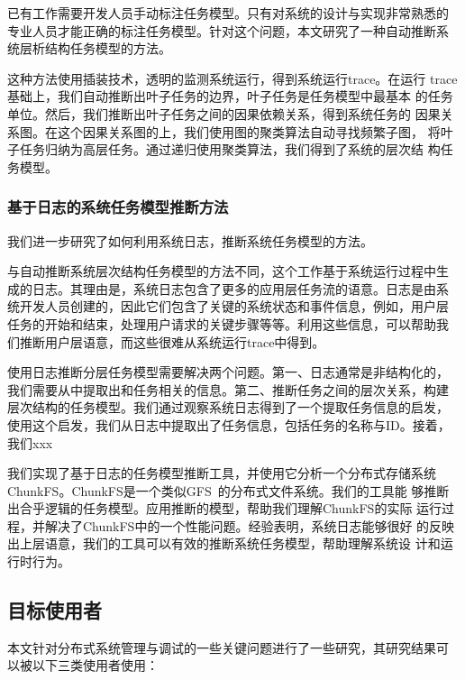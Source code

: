 已有工作需要开发人员手动标注任务模型。只有对系统的设计与实现非常熟悉的
专业人员才能正确的标注任务模型。针对这个问题，本文研究了一种自动推断系
统层析结构任务模型的方法。

这种方法使用插装技术，透明的监测系统运行，得到系统运行trace。在运行
trace基础上，我们自动推断出叶子任务的边界，叶子任务是任务模型中最基本
的任务单位。然后，我们推断出叶子任务之间的因果依赖关系，得到系统任务的
因果关系图。在这个因果关系图的上，我们使用图的聚类算法自动寻找频繁子图，
将叶子任务归纳为高层任务。通过递归使用聚类算法，我们得到了系统的层次结
构任务模型。

\subsubsection*{基于日志的系统任务模型推断方法}

我们进一步研究了如何利用系统日志，推断系统任务模型的方法。

与自动推断系统层次结构任务模型的方法不同，这个工作基于系统运行过程中生
成的日志。其理由是，系统日志包含了更多的应用层任务流的语意。日志是由系
统开发人员创建的，因此它们包含了关键的系统状态和事件信息，例如，用户层
任务的开始和结束，处理用户请求的关键步骤等等。利用这些信息，可以帮助我
们推断用户层语意，而这些很难从系统运行trace中得到。

使用日志推断分层任务模型需要解决两个问题。第一、日志通常是非结构化的，
我们需要从中提取出和任务相关的信息。第二、推断任务之间的层次关系，构建
层次结构的任务模型。我们通过观察系统日志得到了一个提取任务信息的启发，
使用这个启发，我们从日志中提取出了任务信息，包括任务的名称与ID。接着，
我们xxx

我们实现了基于日志的任务模型推断工具，并使用它分析一个分布式存储系统
ChunkFS。ChunkFS是一个类似GFS~\cite{gfs}的分布式文件系统。我们的工具能
够推断出合乎逻辑的任务模型。应用推断的模型，帮助我们理解ChunkFS的实际
运行过程，并解决了ChunkFS中的一个性能问题。经验表明，系统日志能够很好
的反映出上层语意，我们的工具可以有效的推断系统任务模型，帮助理解系统设
计和运行时行为。


\subsection{目标使用者}

本文针对分布式系统管理与调试的一些关键问题进行了一些研究，其研究结果可
以被以下三类使用者使用：

